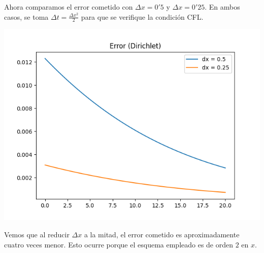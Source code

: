 \documentclass[a4paper, 12pt, oneside]{report}
\begin{document}
Ahora comparamos el error cometido con $\Delta x = 0'5$ y $\Delta x = 0'25$. En ambos casos, se toma $\Delta t = \frac{\Delta x^2}{2}$ para que se verifique la condición CFL.
\begin{center}
    \includegraphics[scale = 0.8]{./images/Figure_3.png}
\end{center}
Vemos que al reducir $\Delta x$ a la mitad, el error cometido es aproximadamente cuatro veces menor. Esto ocurre porque el esquema empleado es de orden $2$ en $x$.
\end{document}
